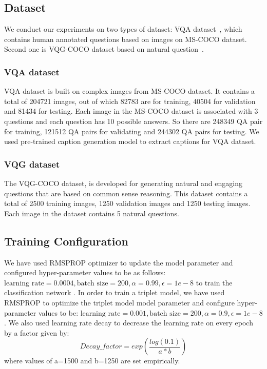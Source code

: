 \documentclass[11pt,a4paper]{article}
\begin{document}
\label{sec-3}
	\subsection{Dataset}
	We conduct our experiments on two types of dataset: VQA dataset~\cite{VQA}, which contains human annotated questions based on images on MS-COCO dataset. Second one is VQG-COCO dataset based on natural question~\cite{mostafazadeh2016generating}. 
	
	\subsubsection{VQA dataset}
	VQA dataset\cite{VQA} is built on complex images from MS-COCO dataset. It contains a total of 204721 images, out of which 82783 are for training, 40504 for validation and 81434 for testing. Each image in the MS-COCO dataset is associated with 3 questions and each question has 10 possible answers. So there are  248349 QA pair for training, 121512 QA pairs for validating and 244302 QA pairs for testing. We used pre-trained caption generation model \cite{Karpathy_NIPS2014} to extract captions for VQA dataset.

	\subsubsection{VQG dataset}
The VQG-COCO dataset\cite{mostafazadeh2016generating}, is developed for generating natural and engaging questions that are based on common sense reasoning. This dataset contains a total of 2500 training images, 1250 validation images and 1250 testing images. Each image in the dataset contains 5 natural questions. 


	\subsection{Training Configuration}
We have used RMSPROP  optimizer to update the model parameter and configured hyper-parameter values to be as follows: {$\text{learning rate}=0.0004, \text{batch size} = 200, \alpha = 0.99, \epsilon=1e-8$} to train the classification network . In order to train a triplet model, we have used RMSPROP to  optimize the triplet model model parameter and configure hyper-parameter values to be: {$\text{learning rate}=0.001, \text{batch size} = 200, \alpha = 0.9, \epsilon=1e-8$}.
We also used learning rate decay to decrease the learning rate on every epoch by a factor given by:
\[Decay\_factor=exp\left(\frac{log(0.1)}{a*b} \right)\] where values of a=1500 and b=1250 are set empirically. 
\end{document}
